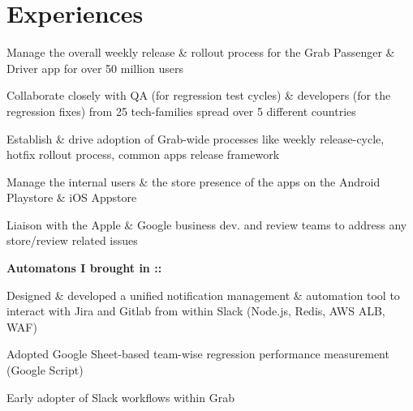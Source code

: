 \documentclass[]{deedy-resume-openfont}
\begin{document}


\smallskip
\smallskip
\section{Experiences}


\begin{tightemize}
\item Manage the overall weekly release \& rollout process for the Grab Passenger \& Driver app for over 50 million users
\item Collaborate closely with QA (for regression test cycles) \& developers (for the regression fixes) from 25 tech-families spread over 5 different countries
\item Establish \& drive adoption of Grab-wide processes like weekly release-cycle, hotfix rollout process, common apps release framework
\item Manage the internal users \& the store presence of the apps on the Android Playstore \& iOS Appstore
\item Liaison with the Apple \& Google business dev. and review teams to address any store/review related issues

\end{tightemize}
\smallskip

\textbf{Automatons I brought in ::}
\begin{tightemize}
	\item Designed \& developed a unified notification management \& automation tool to interact with Jira and Gitlab from within Slack (Node.js, Redis, AWS ALB, WAF)
    \item Adopted Google Sheet-based team-wise regression performance measurement (Google Script)
    \item Early adopter of Slack workflows within Grab

\end{tightemize}
\sectionsep
\end{document}
